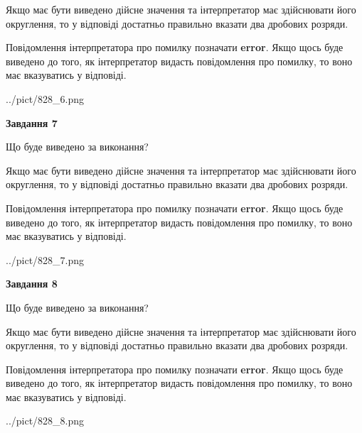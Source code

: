 \documentclass[12pt, ukrainian]{article}
\begin{document}
{\begin {Large}
Якщо має бути виведено дійсне значення та інтерпретатор має здійснювати його округлення, 
то у відповіді достатньо правильно вказати два дробових розряди.

Повідомлення інтерпретатора про помилку позначати \textbf{error}.
Якщо щось буде виведено до того, як інтерпретатор видасть повідомлення про помилку, 
то воно має вказуватись у відповіді. \par

\begin{center}
	{../pict/828_6.png}
\end{center}
\newpage

{\begin {center}\textbf{Завдання 7}\end {center}}\par
Що буде виведено за виконання? \par

Якщо має бути виведено дійсне значення та інтерпретатор має здійснювати його округлення, 
то у відповіді достатньо правильно вказати два дробових розряди.

Повідомлення інтерпретатора про помилку позначати \textbf{error}.
Якщо щось буде виведено до того, як інтерпретатор видасть повідомлення про помилку, 
то воно має вказуватись у відповіді. \par

\begin{center}
	{../pict/828_7.png}
\end{center}
\newpage

{\begin {center}\textbf{Завдання 8}\end {center}}\par
Що буде виведено за виконання? \par

Якщо має бути виведено дійсне значення та інтерпретатор має здійснювати його округлення, 
то у відповіді достатньо правильно вказати два дробових розряди.

Повідомлення інтерпретатора про помилку позначати \textbf{error}.
Якщо щось буде виведено до того, як інтерпретатор видасть повідомлення про помилку, 
то воно має вказуватись у відповіді. \par

\begin{center}
	{../pict/828_8.png}
\end{center}
\newpage


\end{Large}}
\end{document}
